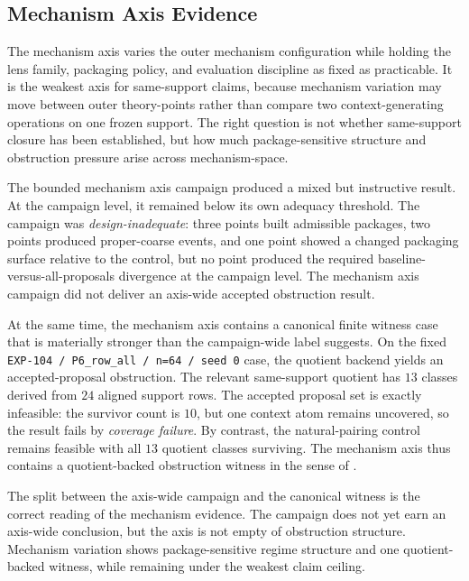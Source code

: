 \documentclass[11pt]{article}
\theoremstyle{definition}
\begin{document}
\subsection{Mechanism Axis Evidence}\label{sec:discovery-mechanism}

The mechanism axis varies the outer mechanism configuration while holding the lens family, packaging policy, and evaluation discipline as fixed as practicable. It is the weakest axis for same-support claims, because mechanism variation may move between outer theory-points rather than compare two context-generating operations on one frozen support. The right question is not whether same-support closure has been established, but how much package-sensitive structure and obstruction pressure arise across mechanism-space.

The bounded mechanism axis campaign produced a mixed but instructive result. At the campaign level, it remained below its own adequacy threshold. The campaign was \emph{design-inadequate}: three points built admissible packages, two points produced proper-coarse events, and one point showed a changed packaging surface relative to the control, but no point produced the required baseline-versus-all-proposals divergence at the campaign level. The mechanism axis campaign did not deliver an axis-wide accepted obstruction result.

At the same time, the mechanism axis contains a canonical finite witness case that is materially stronger than the campaign-wide label suggests. On the fixed \texttt{EXP-104 / P6\_row\_all / n=64 / seed 0} case, the quotient backend yields an accepted-proposal obstruction. The relevant same-support quotient has \(13\) classes derived from \(24\) aligned support rows. The accepted proposal set is exactly infeasible: the survivor count is \(10\), but one context atom remains uncovered, so the result fails by \emph{coverage failure}. By contrast, the natural-pairing control remains feasible with all \(13\) quotient classes surviving. The mechanism axis thus contains a quotient-backed obstruction witness in the sense of .

The split between the axis-wide campaign and the canonical witness is the correct reading of the mechanism evidence. The campaign does not yet earn an axis-wide conclusion, but the axis is not empty of obstruction structure. Mechanism variation shows package-sensitive regime structure and one quotient-backed witness, while remaining under the weakest claim ceiling.
\end{document}
